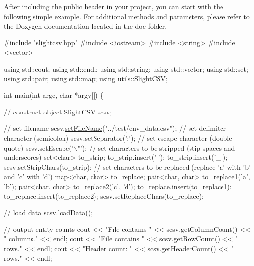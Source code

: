 After including the public header in your project, you can start with the following simple example. For additional methods and parameters, please refer to the Doxygen documentation located in the doc folder.


\begin{DoxyCode}
\textcolor{preprocessor}{#include "slightcsv.hpp"}
\textcolor{preprocessor}{#include <iostream>}
\textcolor{preprocessor}{#include <string>}
\textcolor{preprocessor}{#include <vector>}

\textcolor{keyword}{using} std::cout;
\textcolor{keyword}{using} std::endl;
\textcolor{keyword}{using} std::string;
\textcolor{keyword}{using} std::vector;
\textcolor{keyword}{using} std::set;
\textcolor{keyword}{using} std::pair;
\textcolor{keyword}{using} std::map;
\textcolor{keyword}{using} \hyperlink{classutils_1_1SlightCSV}{utils::SlightCSV};

\textcolor{keywordtype}{int} main(\textcolor{keywordtype}{int} argc, \textcolor{keywordtype}{char} *argv[]) \{

    \textcolor{comment}{// construct object}
    SlightCSV scsv;

    \textcolor{comment}{// set filename}
    scsv.\hyperlink{classutils_1_1SlightCSV_a9567504e450440a9564053c8ab6f6ff9}{setFileName}(\textcolor{stringliteral}{"../test/env\_data.csv"});
    \textcolor{comment}{// set delimiter character (semicolon)}
    scsv.setSeparator(\textcolor{charliteral}{';'});
    \textcolor{comment}{// set escape character (double quote)}
    scsv.setEscape(\textcolor{charliteral}{'\(\backslash\)"'});
    \textcolor{comment}{// set characters to be stripped (stip spaces and underscores)}
    set<char> to\_strip;
    to\_strip.insert(\textcolor{charliteral}{' '});
    to\_strip.insert(\textcolor{charliteral}{'\_'});
    scsv.setStripChars(to\_strip);
    \textcolor{comment}{// set characters to be replaced (replace 'a' with 'b' and 'c' with 'd')}
    map<char, char> to\_replace;
    pair<char, char> to\_replace1(\textcolor{charliteral}{'a'}, \textcolor{charliteral}{'b'});
    pair<char, char> to\_replace2(\textcolor{charliteral}{'c'}, \textcolor{charliteral}{'d'});
    to\_replace.insert(to\_replace1);
    to\_replace.insert(to\_replace2);
    scsv.setReplaceChars(to\_replace);

    \textcolor{comment}{// load data}
    scsv.loadData();

    \textcolor{comment}{// output entity counts}
    cout << \textcolor{stringliteral}{"File contains "} << scsv.getColumnCount() << \textcolor{stringliteral}{" columns."} << endl;
    cout << \textcolor{stringliteral}{"File contains "} << scsv.getRowCount() << \textcolor{stringliteral}{" rows."} << endl;
    cout << \textcolor{stringliteral}{"Header count: "} << scsv.getHeaderCount() << \textcolor{stringliteral}{" rows."} << endl;


\end{DoxyCode}
